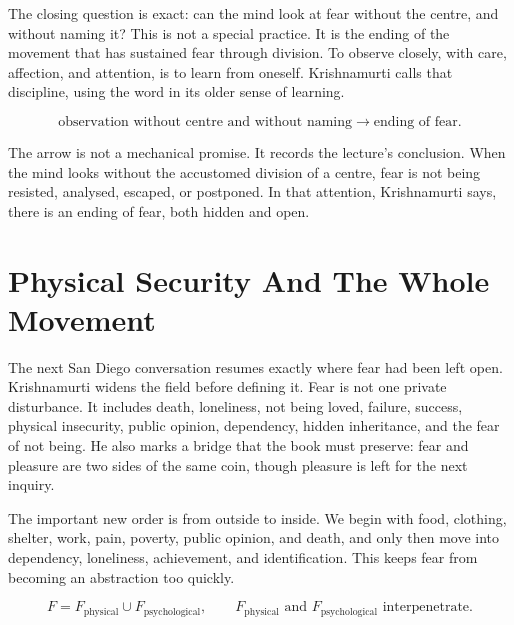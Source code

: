 \documentclass[11pt,oneside]{book}
\begin{document}
The closing question is exact: can the mind look at fear without the centre, and without naming it? This is not a special practice. It is the ending of the movement that has sustained fear through division. To observe closely, with care, affection, and attention, is to learn from oneself. Krishnamurti calls that discipline, using the word in its older sense of learning.

\begin{equation}
\text{observation without centre and without naming}
\longrightarrow
\text{ending of fear}.
\end{equation}

The arrow is not a mechanical promise. It records the lecture's conclusion. When the mind looks without the accustomed division of a centre, fear is not being resisted, analysed, escaped, or postponed. In that attention, Krishnamurti says, there is an ending of fear, both hidden and open.


\section{Physical Security And The Whole Movement}

The next San Diego conversation resumes exactly where fear had been left open. Krishnamurti widens the field before defining it. Fear is not one private disturbance. It includes death, loneliness, not being loved, failure, success, physical insecurity, public opinion, dependency, hidden inheritance, and the fear of not being. He also marks a bridge that the book must preserve: fear and pleasure are two sides of the same coin, though pleasure is left for the next inquiry.

The important new order is from outside to inside. We begin with food, clothing, shelter, work, pain, poverty, public opinion, and death, and only then move into dependency, loneliness, achievement, and identification. This keeps fear from becoming an abstraction too quickly.

\begin{equation}
F = F_{\mathrm{physical}} \cup F_{\mathrm{psychological}},
\qquad
F_{\mathrm{physical}} \text{ and } F_{\mathrm{psychological}} \text{ interpenetrate.}
\end{equation}
\end{document}
